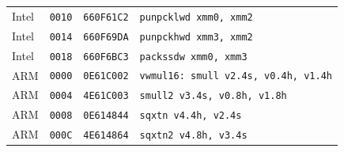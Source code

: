 \begin{table}[htbp]
\begin{tabular}{@{}l|l|l|p{7.2cm}@{}}
Intel & \texttt{0010} & \texttt{660F61C2} & \texttt{punpcklwd xmm0, xmm2} \\
Intel & \texttt{0014} & \texttt{660F69DA} & \texttt{punpckhwd xmm3, xmm2} \\
Intel & \texttt{0018} & \texttt{660F6BC3} & \texttt{packssdw xmm0, xmm3} \\
\midrule
ARM & \texttt{0000} & \texttt{0E61C002} & \texttt{vwmul16: smull v2.4s, v0.4h, v1.4h} \\
ARM & \texttt{0004} & \texttt{4E61C003} & \texttt{smull2 v3.4s, v0.8h, v1.8h} \\
ARM & \texttt{0008} & \texttt{0E614844} & \texttt{sqxtn v4.4h, v2.4s} \\
ARM & \texttt{000C} & \texttt{4E614864} & \texttt{sqxtn2 v4.8h, v3.4s} \\
\bottomrule
\end{tabular}
\endgroup
\end{table}
\noindent{}\par
